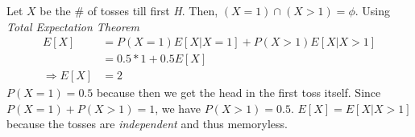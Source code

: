 \documentclass[../../probability-notes.tex]{subfile}
\begin{document}
        Let $X$ be the \# of tosses till first \emph{H}. Then, $(X = 1) \cap (X > 1) = \phi$.
        Using \emph{Total Expectation Theorem}
        \begin{align*}
            E[X] &= P(X = 1)E[X|X = 1] + P(X > 1)E[X|X > 1] \\
            &= 0.5 * 1 + 0.5 E[X] \\
            \Rightarrow E[X] &= 2
        \end{align*}
        $P(X = 1) = 0.5$ because then we get the head in the first toss itself. Since $P(X = 1) + P(X > 1) = 1$, we have $P(X > 1) = 0.5$. $E[X] = E[X|X > 1]$ because the tosses are \emph{independent} and thus memoryless.
\end{document}
